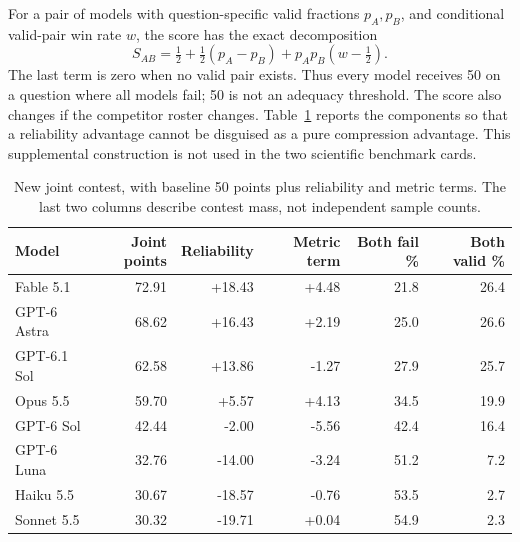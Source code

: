 \documentclass[11pt]{article}
\begin{document}
For a pair of models with question-specific valid fractions $p_A,p_B$, and conditional valid-pair win rate $w$, the score has the exact decomposition
\[
S_{AB}=\tfrac12+\tfrac12(p_A-p_B)+p_Ap_B(w-\tfrac12).
\]
The last term is zero when no valid pair exists. Thus every model receives 50 on a question where all models fail; 50 is not an adequacy threshold. The score also changes if the competitor roster changes. Table~\ref{tab:joint} reports the components so that a reliability advantage cannot be disguised as a pure compression advantage. This supplemental construction is not used in the two scientific benchmark cards.
\begin{table}[htbp]
\centering
\small
\caption{New joint contest, with baseline 50 points plus reliability and metric terms. The last two columns describe contest mass, not independent sample counts.}\label{tab:joint}
\begin{tabular}{lrrrrr}
\toprule
Model & Joint points & Reliability & Metric term & Both fail \% & Both valid \% \\
\midrule
Fable 5.1 & 72.91 & +18.43 & +4.48 & 21.8 & 26.4 \\
GPT-6 Astra & 68.62 & +16.43 & +2.19 & 25.0 & 26.6 \\
GPT-6.1 Sol & 62.58 & +13.86 & -1.27 & 27.9 & 25.7 \\
Opus 5.5 & 59.70 & +5.57 & +4.13 & 34.5 & 19.9 \\
GPT-6 Sol & 42.44 & -2.00 & -5.56 & 42.4 & 16.4 \\
GPT-6 Luna & 32.76 & -14.00 & -3.24 & 51.2 & 7.2 \\
Haiku 5.5 & 30.67 & -18.57 & -0.76 & 53.5 & 2.7 \\
Sonnet 5.5 & 30.32 & -19.71 & +0.04 & 54.9 & 2.3 \\
\bottomrule
\end{tabular}
\end{table}
\end{document}
